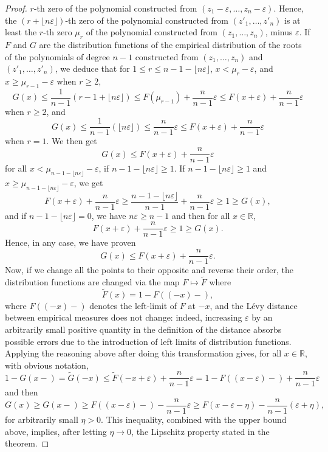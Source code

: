 \documentclass[11pt]{amsart}
\begin{document}
\begin{proof}
$r$-th zero of the polynomial constructed from 
$(z_1- \varepsilon, \dots, z_n - \varepsilon)$. Hence, the 
$(r + \lfloor n \varepsilon \rfloor)$-th zero of the polynomial constructed from $(z'_1, \dots, z'_n)$ is at least the $r$-th zero $\mu_r$ of the 
polynomial constructed from $(z_1, \dots, z_n)$, minus $\varepsilon$. 
If $F$ and $G$ are the distribution functions of the empirical distribution of the roots of the polynomials of degree $n-1$ constructed from 
$(z_1, \dots, z_n)$ and $(z'_1, \dots, z'_n)$, we deduce that for $1 \leq r \leq n - 1 - \lfloor n \varepsilon \rfloor$,  
$x < \mu_r - \varepsilon$, 
and $x \geq  \mu_{r-1} - \varepsilon$ when $r \geq 2$, 
$$G(x) \leq \frac{1}{n-1} (r - 1 + \lfloor n \varepsilon \rfloor) \leq F(\mu_{r-1})   + \frac{n}{n-1} \varepsilon  \leq F(x + \varepsilon) +  \frac{n}{n-1} \varepsilon 
$$
when $r \geq 2$, and 
$$G(x) \leq \frac{1}{n-1} (\lfloor n \varepsilon \rfloor) \leq   \frac{n}{n-1} \varepsilon  \leq F(x + \varepsilon) +  \frac{n}{n-1} \varepsilon 
$$
when $r = 1$. 
We then get 
$$G(x) \leq  F(x + \varepsilon) +  \frac{n}{n-1} \varepsilon $$
for all $x < \mu_{n- 1 - \lfloor n \varepsilon \rfloor} - \varepsilon$, if $n- 1 - \lfloor n \varepsilon \rfloor \geq 1$. 
If $n - 1 -\lfloor n \varepsilon \rfloor \geq 1 $
and $x \geq \mu_{n- 1 - \lfloor n \varepsilon \rfloor}
- \varepsilon$, 
we get 
$$  F(x + \varepsilon) +  \frac{n}{n-1}  \varepsilon
\geq \frac{n - 1 -\lfloor n \varepsilon \rfloor}{n-1}
+ \frac{n}{n-1} \varepsilon \geq 1 \geq G(x),$$
and if $n - 1 - \lfloor n \varepsilon \rfloor = 0$, 
we have $n \varepsilon \geq n-1$ and then for all $x \in \mathbb{R}$, 
$$ F(x + \varepsilon) +  \frac{n}{n-1} \varepsilon
\geq 1 \geq G(x).$$
Hence, in any case, we have proven 
$$G(x) \leq F(x + \varepsilon) + \frac{n}{n-1}  \varepsilon.$$
Now, if we change all the points to their opposite and reverse their order, the distribution functions 
are changed via the map $F \mapsto \widetilde{F}$ where 
$$\widetilde{F} (x) = 1 - F((-x)-),$$
where $F((-x)-)$ denotes the left-limit of $F$ at $-x$,  
and the L\'evy distance between empirical measures does not change: indeed, increasing $\varepsilon$ by an arbitrarily small positive quantity in the definition of the distance absorbs possible errors due to the introduction of left limits of distribution functions. 
Applying the reasoning above after doing this transformation gives, for all $x \in \mathbb{R}$, 
with obvious notation, 
$$1 - G(x-) = \widetilde{G} (-x) \leq \widetilde{F} (-x + \varepsilon) + \frac{n}{n-1} \varepsilon
= 1 - F((x - \varepsilon)-) + \frac{n}{n-1} \varepsilon$$
and then
$$G(x) \geq G(x-) \geq F((x-\varepsilon)-) - \frac{n}{n-1} \varepsilon
\geq F(x-\varepsilon- \eta) - \frac{n}{n-1}
(\varepsilon + \eta),$$
for arbitrarily small $\eta > 0$. 
This inequality, combined with the upper bound above,
implies, after letting $\eta \rightarrow 0$, the Lipschitz property stated in the theorem. 

\end{proof}
\end{document}
